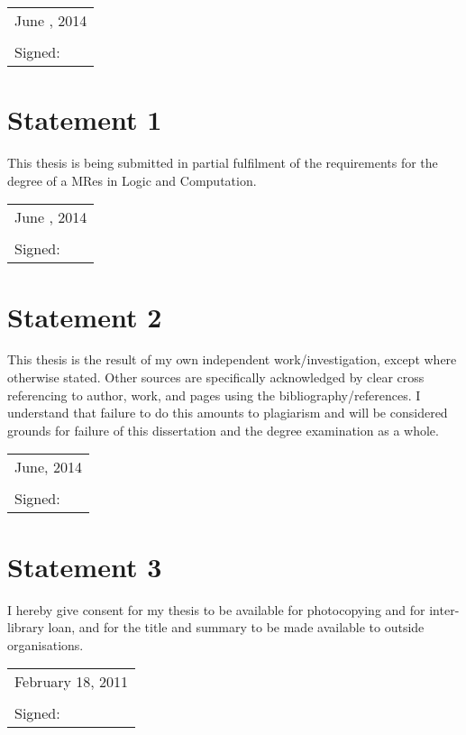 \documentclass[11pt, a4paper, twoside, openright]{book}
\begin{document}
\vspace{0.5cm}
\begin{tabular}{l}
June , 2014\\
\\
Signed:
\end{tabular}

\section*{Statement 1}
This thesis is being submitted in partial fulfilment of the
requirements for the degree of a MRes in Logic and Computation.

\vspace{0.5cm}
\begin{tabular}{l}
June , 2014\\
\\
Signed:
\end{tabular}

\section*{Statement 2}

This thesis is the result of my own independent
work/investigation, except where otherwise stated. Other sources are
specifically acknowledged by clear cross referencing to author, work,
and pages using the bibliography/references. I understand that failure
to do this amounts to plagiarism and will be considered grounds for
failure of this dissertation and the degree examination as a whole.

\vspace{0.5cm}
\begin{tabular}{l}
June, 2014\\
\\
Signed:
\end{tabular}

\section*{Statement 3}

I hereby give consent for my thesis to be available for
photocopying and for inter-library loan, and for the title and summary
to be made available to outside organisations.

\vspace{0.5cm}
\begin{tabular}{l}
February 18, 2011\\
\\
Signed:
\end{tabular}

\clearpage
\thispagestyle{empty}
\mbox{}

\newpage

\tableofcontents


\clearpage
















\end{document}
